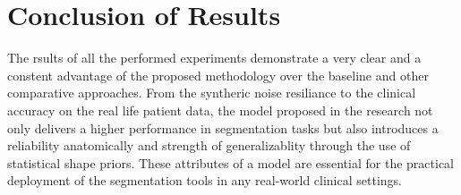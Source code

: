 \section{Conclusion of Results}
The rsults of all the performed experiments demonstrate a very clear and a constent advantage of the proposed methodology over the baseline and other comparative approaches. From the syntheric noise resiliance to the clinical accuracy on the real life patient data, the model proposed in the research not only delivers a higher performance in segmentation tasks but also introduces a reliability anatomically and strength of generalizablity through the use of statistical shape priors. These attributes of a model are essential for the practical deployment of the segmentation tools in any real-world clinical settings.